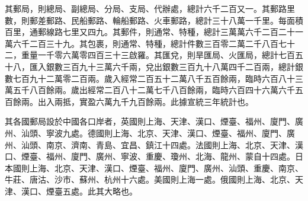 \begin{pinyinscope}
其郵局，則總局、副總局、分局、支局、代辦處，總計六千二百又一。其郵路里數，則郵差郵路、民船郵路、輪船郵路、火車郵路，總計三十八萬一千里。每面積百里，通郵線路七里又四九。其郵件，則通常、特種，總計三萬萬六千二百二十一萬六千二百三十九。其包裹，則通常、特種，總計件數三百零二萬二千八百七十二，重量一千零六萬零四百三十三啟羅。其匯兌，則旱匯局、火匯局，總計七百五十八，匯入銀數三百九十三萬六千兩，兌出銀數三百九十八萬四千二百兩，總計銀數七百九十二萬零二百兩。歲入經常二百五十二萬八千五百餘兩，臨時六百八十三萬五千八百餘兩。歲出經常二百八十二萬七千八百餘兩，臨時六百四十六萬六千五百餘兩。出入兩抵，實盈六萬九千九百餘兩。此據宣統三年統計也。

其各國郵局設於中國各口岸者，英國則上海、天津、漢口、煙臺、福州、廈門、廣州、汕頭、寧波九處。德國則上海、北京、天津、漢口、煙臺、福州、廈門、廣州、汕頭、南京、濟南、青島、宜昌、鎮江十四處。法國則上海、北京、天津、漢口、煙臺、福州、廈門、廣州、寧波、重慶、瓊州、北海、龍州、蒙自十四處。日本國則上海、北京、天津、漢口、煙臺、福州、廈門、廣州、汕頭、重慶、南京、牛莊、唐沽、沙市、蘇州、杭州十六處。美國則上海一處。俄國則上海、北京、天津、漢口、煙臺五處。此其大略也。


\end{pinyinscope}